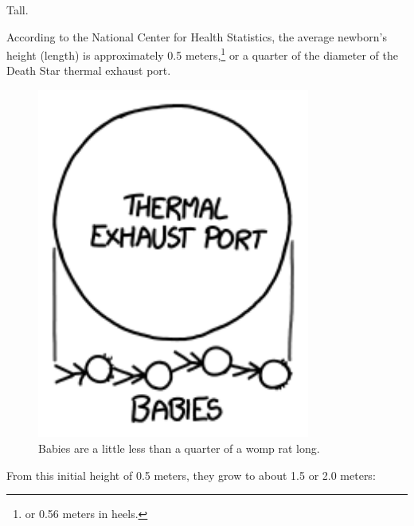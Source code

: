 {\hfill{}

{Tall.}

{According to the National Center for Health Statistics, the average newborn's height (length) is approximately 0.5 meters,{\footnote{or 0.56 meters in heels.} } or a quarter of the diameter of the Death Star thermal exhaust port.}

\begin{figure}[!htbp]
\centering
\includegraphics[scale=0.5, max width=0.8\textwidth]{imgs/a/77/height_deathstar.png}
\caption{Babies are a little less than a quarter of a womp rat long.}
\end{figure}

{From this initial height of 0.5 meters, they grow to about 1.5 or 2.0 meters:}

}

